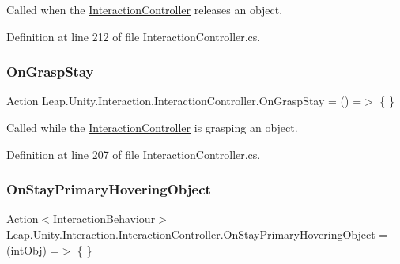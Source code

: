 Called when the \mbox{\hyperlink{class_leap_1_1_unity_1_1_interaction_1_1_interaction_controller}{Interaction\+Controller}} releases an object. 



Definition at line 212 of file Interaction\+Controller.\+cs.

\mbox{\label{class_leap_1_1_unity_1_1_interaction_1_1_interaction_controller_aecda4487fc96ce08c3159d1b4cc92c52}} 
\subsubsection{\texorpdfstring{OnGraspStay}{OnGraspStay}}
{\footnotesize\ttfamily Action Leap.\+Unity.\+Interaction.\+Interaction\+Controller.\+On\+Grasp\+Stay = () =$>$ \{ \}}



Called while the \mbox{\hyperlink{class_leap_1_1_unity_1_1_interaction_1_1_interaction_controller}{Interaction\+Controller}} is grasping an object. 



Definition at line 207 of file Interaction\+Controller.\+cs.

\mbox{\label{class_leap_1_1_unity_1_1_interaction_1_1_interaction_controller_ada639d7fe85125f34caa98faabe131c2}} 
\subsubsection{\texorpdfstring{OnStayPrimaryHoveringObject}{OnStayPrimaryHoveringObject}}
{\footnotesize\ttfamily Action$<$\mbox{\hyperlink{class_leap_1_1_unity_1_1_interaction_1_1_interaction_behaviour}{Interaction\+Behaviour}}$>$ Leap.\+Unity.\+Interaction.\+Interaction\+Controller.\+On\+Stay\+Primary\+Hovering\+Object = (int\+Obj) =$>$ \{ \}}



